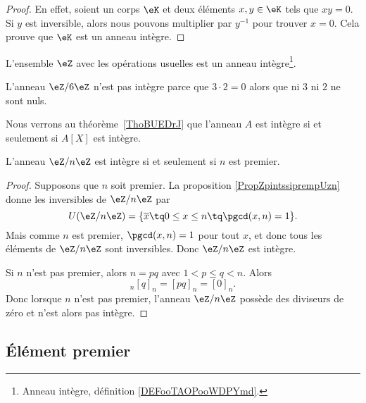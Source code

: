\begin{proof}
    En effet, soient un corps \( \eK\) et deux éléments \( x,y\in \eK\) tels que \( xy=0\). Si \( y\) est inversible, alors nous pouvons multiplier par \( y^{-1}\) pour trouver \( x=0\). Cela prouve que \( \eK\) est un anneau intègre.
\end{proof}

\begin{example}     \label{EXooLDXRooSxUAXs}
    L'ensemble \( \eZ\) avec les opérations usuelles est un anneau intègre\footnote{Anneau intègre, définition \ref{DEFooTAOPooWDPYmd}.}.
\end{example}

\begin{example}
    L'anneau \( \eZ/6\eZ\) n'est pas intègre parce que \( 3\cdot 2=0\) alors que ni \( 3\) ni \( 2\) ne sont nuls.
\end{example}

Nous verrons au théorème~\ref{ThoBUEDrJ} que l'anneau \( A\) est intègre si et seulement si \( A[X]\) est intègre.

\begin{corollary}   \label{CorZnInternprem}
    L'anneau \( \eZ/n\eZ\) est intègre si et seulement si \( n\) est premier.
\end{corollary}

\begin{proof}
    Supposons que \( n\) soit premier. La proposition \ref{PropZpintssiprempUzn} donne les inversibles de \( \eZ/n\eZ\) par
    \begin{equation}
        U(\eZ/n\eZ)=\{ \overline x\tq 0\leq x\leq n\tq\pgcd(x,n)=1 \}.
    \end{equation}
    Mais comme \( n\) est premier, \( \pgcd(x,n)=1\) pour tout \( x\), et donc tous les éléments de \( \eZ/n\eZ\) sont inversibles. Donc \( \eZ/n\eZ\) est intègre.

    Si \( n\) n'est pas premier, alors \( n=pq\) avec \( 1<p\leq q<n\). Alors
    \begin{equation}
        [p]_n[q]_n=[pq]_n=[0]_n.
    \end{equation}
    Donc lorsque \( n\) n'est pas premier,  l'anneau \( \eZ/n\eZ\) possède des diviseurs de zéro et n'est alors pas intègre.
\end{proof}


\subsection{Élément premier}

